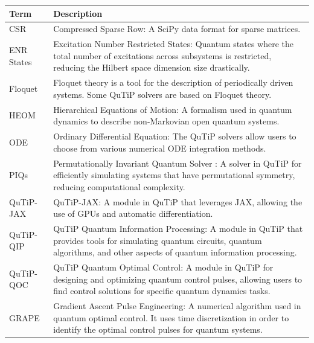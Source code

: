 \documentclass[preprint,3p,sort&compress]{elsarticle}
\begin{document}
\begin{table}[ht]
    \centering
         \renewcommand{\arraystretch}{1.3} 
    \begin{tabular}{@{}lp{12cm}@{}}
        \toprule
        \textbf{Term} & \textbf{Description} \\  
 \midrule
        CSR & Compressed Sparse Row: A SciPy data format for sparse matrices. \\
 
        ENR States & Excitation Number Restricted States: Quantum states where the total number of excitations across subsystems is restricted, reducing the Hilbert space dimension size drastically. \\
  
        Floquet & Floquet theory is a tool for the description of periodically driven systems. Some QuTiP solvers are based on Floquet theory. \\
 
        HEOM & Hierarchical Equations of Motion: A formalism used in quantum dynamics to describe non-Markovian open quantum systems. \\
      
        ODE & Ordinary Differential Equation: The QuTiP solvers allow users to choose from various numerical ODE integration methods. \\

        PIQs & Permutationally Invariant Quantum Solver \cite{Shammah_2018}: A solver in QuTiP for efficiently simulating systems that have permutational symmetry, reducing computational complexity. \\

        QuTiP-JAX & QuTiP-JAX: A module in QuTiP that leverages JAX, allowing the use of GPUs and automatic differentiation. \\

        QuTiP-QIP & QuTiP Quantum Information Processing: A module in QuTiP that provides tools for simulating quantum circuits, quantum algorithms, and other aspects of quantum information processing. \\

        QuTiP-QOC & QuTiP Quantum Optimal Control: A module in QuTiP for designing and optimizing quantum control pulses, allowing users to find control solutions for specific quantum dynamics tasks. \\   
 
        GRAPE & Gradient Ascent Pulse Engineering: A numerical algorithm used in quantum optimal control. It uses time discretization in order to identify the optimal control pulses for quantum systems. \\
  

\end{tabular}
\end{table}
\end{document}
